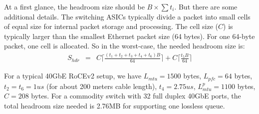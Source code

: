 \begin{appendices}
At a first glance, the headroom size should be $B\times\sum t_i$. But there are some additional details. The switching ASICs typically divide a packet into small cells of equal size for internal packet storage and processing. The cell size ($C$) is typically larger than the smallest Ethernet packet size (64 bytes). For one 64-byte packet, one cell is allocated. So in the worst-case, the needed headroom size is:
\begin{eqnarray} \label{eqn:pfcheadroom}
S_{hdr} & = &  C\lceil\frac{(t_1+t_2+t_3+t_4 + t_6)B}{64}\rceil + C\lceil \frac{t_5 B}{64}\rceil \nonumber
\end{eqnarray}

For a typical 40GbE RoCEv2 setup, we have $L_{mtu}=1500$ bytes, $L_{pfc}=64$ bytes, $t_2=t_6=1us$ (for about 200 meters cable length), $t_4=2.75us$, $L^{p}_{mtu}=1100$ bytes, $C=208$ bytes.
For a commodity switch with 32 full duplex 40GbE ports, the total headroom size needed is 2.76MB for supporting one lossless queue. 
\end{appendices} 
